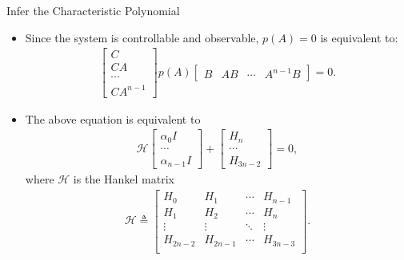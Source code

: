 \documentclass[10pt]{beamer}
\begin{document}
\begin{frame}{Infer the Characteristic Polynomial}
  \begin{itemize}
  \item Since the system is controllable and observable, $p(A) = 0$ is equivalent to:
    \begin{align*}
      \begin{bmatrix}
        C\\
        CA\\
        \cdots\\
        CA^{n-1}
      \end{bmatrix}p(A)\begin{bmatrix}
        B&AB&\cdots&A^{n-1}B
      \end{bmatrix}=0.
    \end{align*}
  \item The above equation is equivalent to
    \begin{align*}
      \mathcal H   \begin{bmatrix}
        \alpha_0I\\
        \cdots\\
        \alpha_{n-1}I
      \end{bmatrix} + \begin{bmatrix}
        H_n\\
        \cdots\\
        H_{3n-2} 
      \end{bmatrix} = 0    ,
    \end{align*}
    where $\mathcal H$ is the Hankel matrix
    \begin{align*}
      \mathcal H \triangleq \begin{bmatrix}
        H_{0} & H_{1} &\cdots & H_{n-1}\\
        H_{1} & H_{2} &\cdots & H_{n}\\
        \vdots & \vdots &\ddots & \vdots \\
        H_{2n-2} & H_{2n-1} &\cdots & H_{3n-3}\\
      \end{bmatrix}. 
    \end{align*}
  \end{itemize} 
\end{frame}
\end{document}
